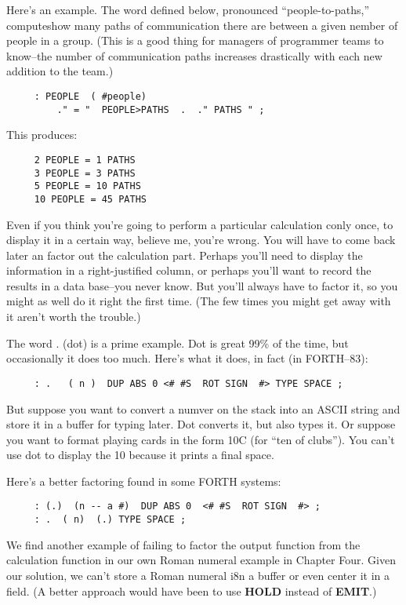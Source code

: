 Here's an example. The word defined below, pronounced ``people-to-paths,'' computeshow many paths of communication there are between a given nember of people in a group. (This is a good thing for managers of programmer teams to know--the number of communication paths increases drastically with each new addition to the team.)

\begin{verbatim}
     : PEOPLE  ( #people)
         ." = "  PEOPLE>PATHS  .  ." PATHS " ;
\end{verbatim}
This produces:

\begin{verbatim}
     2 PEOPLE = 1 PATHS
     3 PEOPLE = 3 PATHS
     5 PEOPLE = 10 PATHS
     10 PEOPLE = 45 PATHS
\end{verbatim}
Even if you think you're going to perform a particular calculation conly once, to display it in a certain way, believe me, you're wrong. You will have to come back later an factor out the calculation part. Perhaps you'll need to display the information in a right-justified column, or perhaps you'll want to record the results in a data base--you never know. But you'll always have to factor it, so you might as well do it right the first time. (The few times you might get away with it aren't worth the trouble.)

The word . (dot) is a prime example. Dot is great 99\% of the time, but occasionally it does too much. Here's what it does, in fact (in FORTH--83):

\begin{verbatim}
     : .   ( n )  DUP ABS 0 <# #S  ROT SIGN  #> TYPE SPACE ;
\end{verbatim}
But suppose you want to convert a numver on the stack into an ASCII string and store it in a buffer for typing later. Dot converts it, but also types it. Or suppose you want to format playing cards in the form 10C (for ``ten of clubs''). You can't use dot to display the 10 because it prints a final space.

Here's a better factoring found in some FORTH systems:

\begin{verbatim}
     : (.)  (n -- a #)  DUP ABS 0  <# #S  ROT SIGN  #> ;
     : .  ( n)  (.) TYPE SPACE ;
\end{verbatim}
We find another example of failing to factor the output function from the calculation function in our own Roman numeral example in Chapter Four. Given our solution, we can't store a Roman numeral i8n a buffer or even center it in a field. (A better approach would have been to use \textbf{HOLD} instead of \textbf{EMIT}.)

